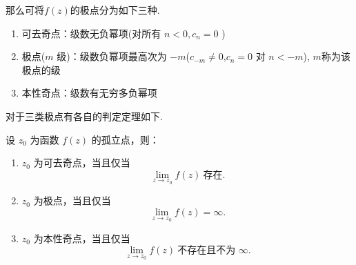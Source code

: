 \documentclass[openany,oneside]{ctexbook}
\begin{document}
那么可将$f(z)$的极点分为如下三种.
\begin{definition}
  \begin{enumerate}
  \item 可去奇点：级数无负幂项(对所有 $n < 0,c_n = 0$ )
  \item 极点($m$ 级)：级数负幂项最高次为 $-m$($c_{-m} \neq 0$,$c_n = 0$ 对 $n < -m$), $m$称为该极点的级
  \item 本性奇点：级数有无穷多负幂项
\end{enumerate}
\end{definition}
对于三类极点有各自的判定定理如下.
\begin{theorem}
设 $z_0$ 为函数 $f(z)$ 的孤立点，则：
\begin{enumerate}
  \item $z_0$ 为可去奇点，当且仅当
  \[
    \lim_{z \to z_0} f(z) \ \text{存在}.
  \]

  \item $z_0$ 为极点，当且仅当
  \[
    \lim_{z \to z_0} f(z) = \infty.
  \]

  \item $z_0$ 为本性奇点，当且仅当
  \[
    \lim_{z \to z_0} f(z) \ \text{不存在且不为 } \infty.
  \]
\end{enumerate}
\end{theorem}
\end{document}
